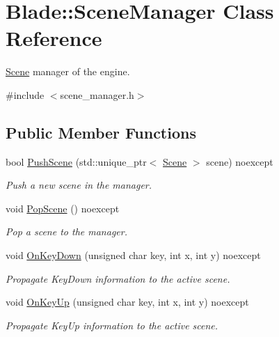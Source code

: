 \hypertarget{class_blade_1_1_scene_manager}{}\section{Blade\+:\+:Scene\+Manager Class Reference}
\label{class_blade_1_1_scene_manager}


\hyperlink{class_blade_1_1_scene}{Scene} manager of the engine.  




{\ttfamily \#include $<$scene\+\_\+manager.\+h$>$}

\subsection*{Public Member Functions}
\begin{DoxyCompactItemize}
\item 
bool \hyperlink{class_blade_1_1_scene_manager_a3bdd62a565c3b39bb0ae0399f16b36d5}{Push\+Scene} (std\+::unique\+\_\+ptr$<$ \hyperlink{class_blade_1_1_scene}{Scene} $>$ scene) noexcept
\begin{DoxyCompactList}\small\item\em Push a new scene in the manager. \end{DoxyCompactList}\item 
\mbox{\label{class_blade_1_1_scene_manager_af71cf80bd23a9b708abccd58c110c183}} 
void \hyperlink{class_blade_1_1_scene_manager_af71cf80bd23a9b708abccd58c110c183}{Pop\+Scene} () noexcept
\begin{DoxyCompactList}\small\item\em Pop a scene to the manager. \end{DoxyCompactList}\item 
void \hyperlink{class_blade_1_1_scene_manager_a58a554c9fbce22aa0e09b51d4811f9fe}{On\+Key\+Down} (unsigned char key, int x, int y) noexcept
\begin{DoxyCompactList}\small\item\em Propagate Key\+Down information to the active scene. \end{DoxyCompactList}\item 
void \hyperlink{class_blade_1_1_scene_manager_ad2841ecb96bdfc11134e365ae2f8eb51}{On\+Key\+Up} (unsigned char key, int x, int y) noexcept
\begin{DoxyCompactList}\small\item\em Propagate Key\+Up information to the active scene. \end{DoxyCompactList}\item 

\end{DoxyCompactItemize}
